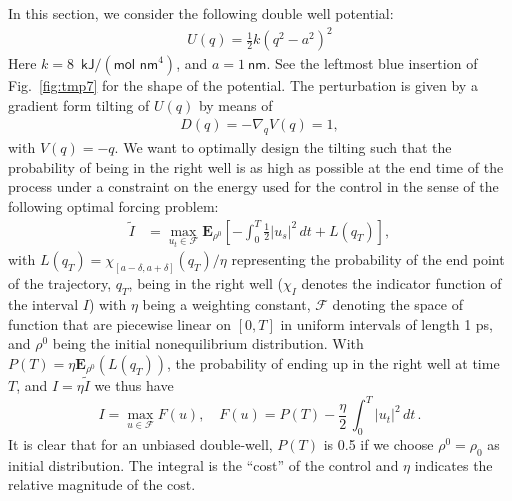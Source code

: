 \documentclass[]{tMPH2e}
\newcommand{\bE}{{\mathbf E}}
\begin{document}
In this section, we consider the following double well potential:
\begin{align}
  U( q) = \frac12 k ( q^2 - a^2)^2
\end{align}
Here $k = 8$~$\textsf{kJ} / (\textsf{mol nm}^4)$, and $ a = 1\
\textsf{nm}$.  See the leftmost blue insertion of Fig.~\ref{fig:tmp7} for
the shape of the potential.
The perturbation is given by a gradient form tilting of $U( q)$ by means of
\begin{align}
   D( q) = -\nabla_{ q} V( q) = 1,
\end{align}
with $V( q) = - q$. We want to
optimally design the tilting such that the probability
of being in the right well is as high as possible 
at the end time of the process under a constraint on the energy used for the control in the sense of
the following optimal forcing problem:
\begin{align}
  \tilde{I} & = \max_{u_t \in\mathcal F} \bE_{\rho^0}\left[ -\int_{0}^{T} \frac{1}{2}|u_{s}|^{2}\,dt + L(q_T) \right],
\end{align}
with $L(q_T)=\chi_{[a-\delta,a+\delta]}(q_T)/\eta$ representing the probability of the end point of the trajectory, $ q_T$, being in the right well ($\chi_I$ denotes the indicator function of the interval $I$) with $\eta$ being a weighting constant, ${\mathcal F}$ denoting the space of function that are piecewise linear  on $[0, T]$ in uniform intervals of length 1 ps, and $\rho^0$ being the initial nonequilibrium distribution. With $P(T) = \eta \bE_{\rho^0}(L(q_T))$, the probability of ending up in the right well at time $T$, and $I=\eta \tilde{I}$ we thus have
\[
  I = \max_{u \in\mathcal F} F(u),\quad F(u)= P(T) -
  \frac{\eta}{2}\,
   \int_0^T |u_t|^2\, dt\,.
\]
 It is
clear that for an unbiased double-well, $P(T)$
is 0.5 if we choose $\rho^0=\rho_0$ as initial distribution.  The integral is the ``cost'' of the control and $\eta$  indicates the relative magnitude of the
cost. 
\end{document}
